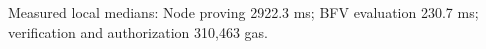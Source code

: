 \small Measured local medians: Node proving 2922.3 ms; BFV evaluation 230.7 ms; verification and authorization 310,463 gas.
